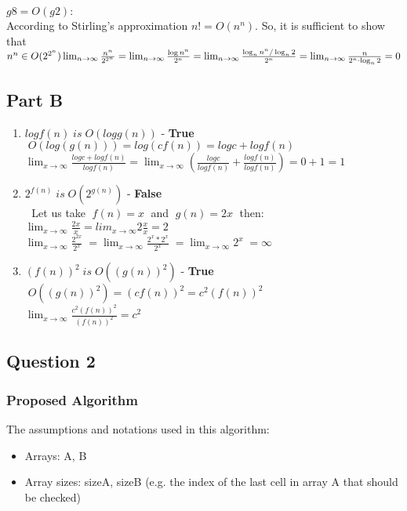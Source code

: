 \documentclass{article}
\begin{document}
$g8 = O(g2):$\\
 According to Stirling's approximation $n! = O(n^n)$. So, it is
sufficient to show that $n^n \in O(2^{2^n})\\
\lim_{n\to\infty}\frac{n^n}{2^{2^n}} = 
\lim_{n\to\infty}\frac{\log n^n}{2^n} = 
\lim_{n\to\infty}\frac{\log_n n^n/\log_n2}{2^n} = 
\lim_{n\to\infty}\frac{n}{2^n\cdot\log_n2} = 0$\\
\vfill
\subsection*{Part B}
\begin{enumerate}
  \item $log {f(n)} \; is \; O(log {g(n)})$ - \textbf{True}
    \\ $\; O(log(g(n))) = log {(cf(n))} = log c + log {f(n)}$
	\\ $\lim_{x\to\infty}\frac{log c + log {f(n)}}{log {f(n)}} =
	    \lim_{x\to\infty}(\frac{log c}{log {f(n)}} + \frac{log {f(n)}}{log
	    {f(n)}}) = 0 + 1 = 1$
  \item $2^{f(n)} \; is \; O(2^{g(n)})$ - \textbf{False}
    \\ $\; $ Let us take $\; f(n) = x \;$ and $\; g(n) = 2x \;$ then:
    \\ $\lim_{x\to\infty}\frac{2x}{x} = lim_{x\to\infty}2\frac{x}{x} = 2$
    \\ $\lim_{x\to\infty}\frac{2^{2x}}{2^x} \; =
        \lim_{x\to\infty}\frac{2^x*2^x}{2^x} \; =
        \lim_{x\to\infty}{2^x} \; = \infty$
  \item $(f(n))^2 \; is \; O((g(n))^2)$ - \textbf{True}
    \\ $\; O((g(n))^2) = (cf(n))^2 = c^2(f(n))^2$
    \\ $\lim_{x\to\infty}\frac{c^2(f(n))^2}{(f(n))^2} = c^2$
\end{enumerate}
\vfill
\subsection*{Question 2}
\subsubsection*{Proposed Algorithm}
The assumptions and notations used in this algorithm:
\begin{itemize}
  \item Arrays: A, B
  \item Array sizes: sizeA, sizeB (e.g. the index of the last cell in array A
  that should be checked)
\end{itemize}
\end{document}

